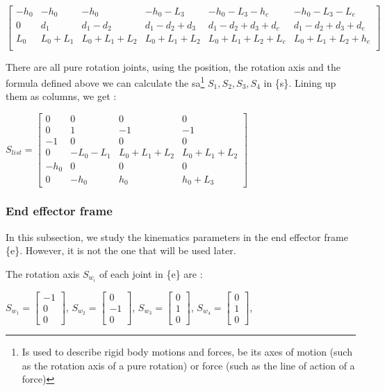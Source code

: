 \begin{center}
    $
    \begin{bmatrix}
        -h_0 & -h_0 & -h_0 & -h_0-L_3 & -h_0-L_3-h_c & -h_0-L_3-L_e  \\
        0 & d_1 & d_1-d_2 & d_1-d_2+d_3 & d_1-d_2+d_3+d_c & d_1-d_2+d_3+d_e \\
        L_0 & L_0+L_1 & L_0+L_1+L_2 & L_0+L_1+L_2 & L_0+L_1+L_2+L_c & L_0+L_1+L_2+h_e \\
    \end{bmatrix}
    $
\end{center}

\bigbreak
There are all pure rotation joints, using the position, the rotation axis and the formula defined above we can calculate the \gls{sa}\footnote{Is used to describe rigid body motions and forces, be its axes of motion (such as the rotation axis of a pure rotation) or force (such as the line of action of a force)} $S_1,S_2,S_3,S_4$ in \{s\}. Lining up them as columns, we get : 

\begin{center}
    $S_{list} = 
    \begin{bmatrix}
        0 & 0 & 0 & 0 \\
        0 & 1 & -1 & -1 \\
        -1 & 0 & 0 & 0 \\
        0 & -L_0-L_1 & L_0+L_1+L_2 & L_0+L_1+L_2 \\
        -h_0 & 0 & 0 & 0 \\
        0 & -h_0 & h_0 & h_0+L_3
    \end{bmatrix}
    $
\end{center}

\subsubsection{End effector frame}

In this subsection, we study the kinematics parameters in the end effector frame \{e\}. However, it is not the one that will be used later. 

\bigbreak
The rotation axis $S_{w_i}$ of each joint  in \{e\} are : 
\begin{center}
    $S_{w_1} = \begin{bmatrix} -1 \\ 0 \\ 0\end{bmatrix}$,
    $S_{w_2} = \begin{bmatrix} 0 \\ -1 \\ 0\end{bmatrix}$,
    $S_{w_3} = \begin{bmatrix} 0 \\ 1 \\ 0\end{bmatrix}$,
    $S_{w_4} = \begin{bmatrix} 0 \\ 1 \\ 0\end{bmatrix}$,
\end{center}

